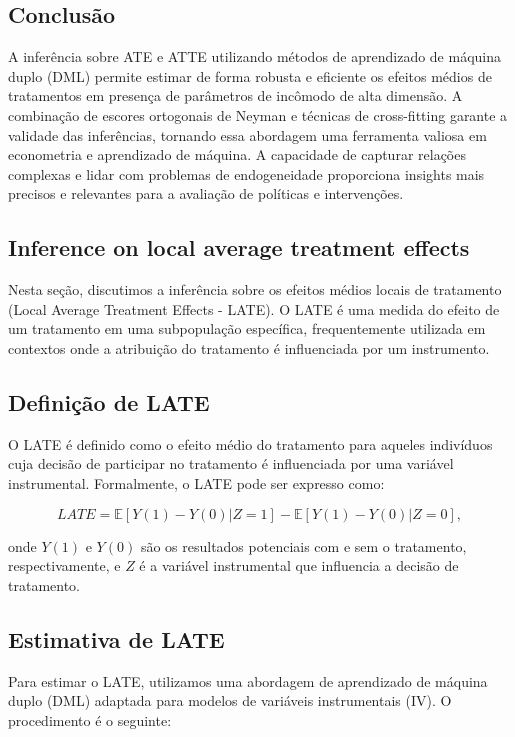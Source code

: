 \documentclass[a4paper,12pt]{article}[abntex2]
\begin{document}
\subsection*{Conclusão}

A inferência sobre ATE e ATTE utilizando métodos de aprendizado de máquina duplo (DML) permite estimar de forma robusta e eficiente os efeitos médios de tratamentos em presença de parâmetros de incômodo de alta dimensão. A combinação de escores ortogonais de Neyman e técnicas de cross-fitting garante a validade das inferências, tornando essa abordagem uma ferramenta valiosa em econometria e aprendizado de máquina. A capacidade de capturar relações complexas e lidar com problemas de endogeneidade proporciona insights mais precisos e relevantes para a avaliação de políticas e intervenções.


\subsection{Inference on local average treatment effects}

Nesta seção, discutimos a inferência sobre os efeitos médios locais de tratamento (Local Average Treatment Effects - LATE). O LATE é uma medida do efeito de um tratamento em uma subpopulação específica, frequentemente utilizada em contextos onde a atribuição do tratamento é influenciada por um instrumento.

\subsection*{Definição de LATE}

O LATE é definido como o efeito médio do tratamento para aqueles indivíduos cuja decisão de participar no tratamento é influenciada por uma variável instrumental. Formalmente, o LATE pode ser expresso como:

\[
LATE = \mathbb{E}[Y(1) - Y(0) | Z = 1] - \mathbb{E}[Y(1) - Y(0) | Z = 0],
\]

onde $Y(1)$ e $Y(0)$ são os resultados potenciais com e sem o tratamento, respectivamente, e $Z$ é a variável instrumental que influencia a decisão de tratamento.

\subsection*{Estimativa de LATE}

Para estimar o LATE, utilizamos uma abordagem de aprendizado de máquina duplo (DML) adaptada para modelos de variáveis instrumentais (IV). O procedimento é o seguinte:
\end{document}
